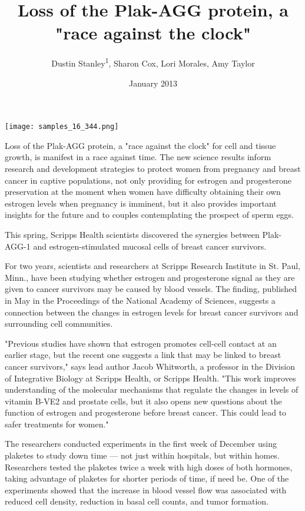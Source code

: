 \documentclass{article}
\title{Loss of the Plak-AGG protein, a "race against the clock"}
\author{Dustin Stanley\textsuperscript{1},  Sharon Cox,  Lori Morales,  Amy Taylor}
\affil{\textsuperscript{1}Kurume University}
\date{January 2013}
\begin{document}
\maketitle

\begin{center}
\begin{minipage}{0.75\linewidth}
\texttt{[image: samples\_16\_344.png]}
\end{minipage}
\end{center}

Loss of the Plak-AGG protein, a "race against the clock" for cell and tissue growth, is manifest in a race against time. The new science results inform research and development strategies to protect women from pregnancy and breast cancer in captive populations, not only providing for estrogen and progesterone preservation at the moment when women have difficulty obtaining their own estrogen levels when pregnancy is imminent, but it also provides important insights for the future and to couples contemplating the prospect of sperm eggs.

This spring, Scripps Health scientists discovered the synergies between Plak-AGG-1 and estrogen-stimulated mucosal cells of breast cancer survivors.

For two years, scientists and researchers at Scripps Research Institute in St. Paul, Minn., have been studying whether estrogen and progesterone signal as they are given to cancer survivors may be caused by blood vessels. The finding, published in May in the Proceedings of the National Academy of Sciences, suggests a connection between the changes in estrogen levels for breast cancer survivors and surrounding cell communities.

"Previous studies have shown that estrogen promotes cell-cell contact at an earlier stage, but the recent one suggests a link that may be linked to breast cancer survivors," says lead author Jacob Whitworth, a professor in the Division of Integrative Biology at Scripps Health, or Scripps Health. "This work improves understanding of the molecular mechanisms that regulate the changes in levels of vitamin B-VE2 and prostate cells, but it also opens new questions about the function of estrogen and progesterone before breast cancer. This could lead to safer treatments for women."

The researchers conducted experiments in the first week of December using plaketes to study down time — not just within hospitals, but within homes. Researchers tested the plaketes twice a week with high doses of both hormones, taking advantage of plaketes for shorter periods of time, if need be. One of the experiments showed that the increase in blood vessel flow was associated with reduced cell density, reduction in basal cell counts, and tumor formation.
\end{document}
